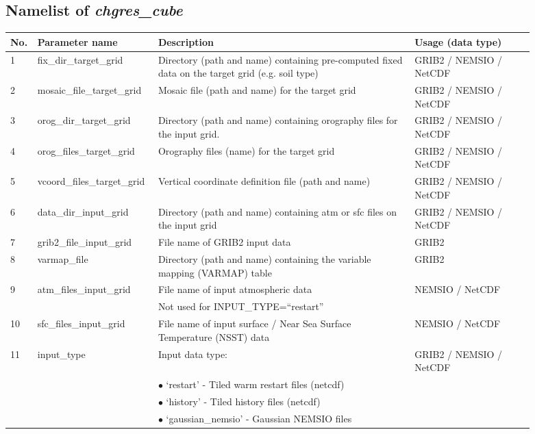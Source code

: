 \documentclass[11pt,fleqn]{report}              %
\begin{document}
\subsection{Namelist of {\it chgres\_cube}}
\label{subsec:namelist_chgres_cube}

{
\scriptsize
\begin{longtable}{p{0.02\linewidth} | p{0.18\linewidth} | p{0.47\linewidth} | p{0.22\linewidth}}
\hline
\hline
No. & Parameter name & Description & Usage (data type)\\
\hline
1 & fix\_dir\_target\_grid & Directory (path and name) containing pre-computed fixed data on the target grid (e.g. soil type) & GRIB2 / NEMSIO / NetCDF \\
2 & mosaic\_file\_target\_grid & Mosaic file (path and name) for the target grid   & GRIB2 / NEMSIO / NetCDF \\
3 & orog\_dir\_target\_grid & Directory (path and name) containing orography files for the input grid. & GRIB2 / NEMSIO / NetCDF \\
4 & orog\_files\_target\_grid & Orography files (name) for the target grid & GRIB2 / NEMSIO / NetCDF \\
5 & vcoord\_files\_target\_grid & Vertical coordinate definition file (path and name) & GRIB2 / NEMSIO / NetCDF \\
6 & data\_dir\_input\_grid & Directory (path and name) containing atm or sfc files on the input grid & GRIB2 / NEMSIO / NetCDF \\
7 & grib2\_file\_input\_grid & File name of GRIB2 input data & GRIB2 \\
8 & varmap\_file & Directory (path and name) containing the variable mapping (VARMAP) table & GRIB2 \\
9 & atm\_files\_input\_grid & File name of input atmospheric data & NEMSIO / NetCDF\\
  & & Not used for INPUT\_TYPE=``restart''  & \\
10 & sfc\_files\_input\_grid & File name of input surface / Near Sea Surface Temperature (NSST) data & NEMSIO / NetCDF \\
11 & input\_type & Input data type: & GRIB2 / NEMSIO / NetCDF \\
     & & $\bullet$ `restart' - Tiled warm restart files (netcdf) &\\
     & & $\bullet$ `history' - Tiled history files (netcdf) &\\
     & & $\bullet$ `gaussian\_nemsio' - Gaussian NEMSIO files &\\

\end{longtable}}
\end{document}
